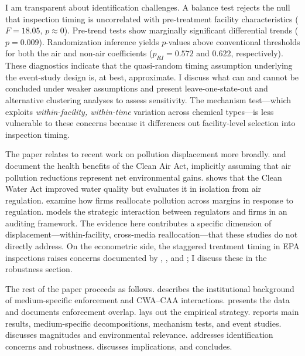 \documentclass[12pt]{article}
\begin{document}
I am transparent about identification challenges. A balance test rejects the null that inspection timing is uncorrelated with pre-treatment facility characteristics ($F = 18.05$, $p \approx 0$). Pre-trend tests show marginally significant differential trends ($p = 0.009$). Randomization inference yields $p$-values above conventional thresholds for both the air and non-air coefficients ($p_{RI} = 0.572$ and $0.622$, respectively). These diagnostics indicate that the quasi-random timing assumption underlying the event-study design is, at best, approximate. I discuss what can and cannot be concluded under weaker assumptions and present leave-one-state-out and alternative clustering analyses to assess sensitivity. The mechanism test---which exploits \textit{within-facility, within-time} variation across chemical types---is less vulnerable to these concerns because it differences out facility-level selection into inspection timing.

The paper relates to recent work on pollution displacement more broadly. \citet{chay2003impact} and \citet{currie2020air} document the health benefits of the Clean Air Act, implicitly assuming that air pollution reductions represent net environmental gains. \citet{keiser2019consequences} shows that the Clean Water Act improved water quality but evaluates it in isolation from air regulation. \citet{chenroth2023} examine how firms reallocate pollution across margins in response to regulation. \citet{stafford2012auditing} models the strategic interaction between regulators and firms in an auditing framework. The evidence here contributes a specific dimension of displacement---within-facility, cross-media reallocation---that these studies do not directly address. On the econometric side, the staggered treatment timing in EPA inspections raises concerns documented by \citet{callawaysantanna2021}, \citet{dechaisemartin2020}, and \citet{sunab2021}; I discuss these in the robustness section.

The rest of the paper proceeds as follows.  describes the institutional background of medium-specific enforcement and CWA--CAA interactions.  presents the data and documents enforcement overlap.  lays out the empirical strategy.  reports main results, medium-specific decompositions, mechanism tests, and event studies.  discusses magnitudes and environmental relevance.  addresses identification concerns and robustness.  discusses implications, and  concludes.
\end{document}
